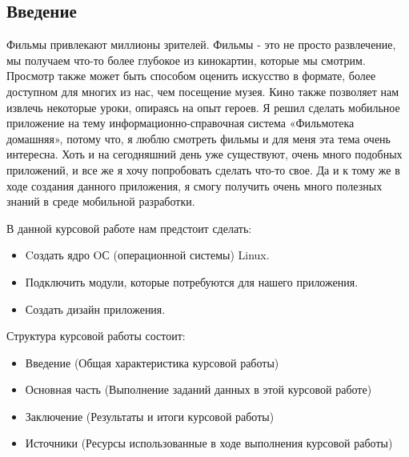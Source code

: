 
\setcounter{section}{1}
\begin{center}
\section*{Введение}
\end{center}

Фильмы привлекают миллионы зрителей. Фильмы - это не просто развлечение, мы получаем что-то более глубокое из кинокартин, которые мы смотрим. Просмотр также может быть способом оценить искусство в формате, более доступном для многих из нас, чем посещение музея. Кино также позволяет нам извлечь некоторые уроки, опираясь на опыт героев. Я решил сделать мобильное приложение на тему информационно-справочная система «Фильмотека домашняя», потому что, я люблю смотреть фильмы и для меня эта тема очень интересна. Хоть и на сегодняшний день уже существуют, очень много подобных приложений, и все же я хочу попробовать сделать что-то свое. Да и к тому же в ходе создания данного приложения, я смогу получить очень много полезных знаний в среде мобильной разработки. 

\noindent В данной курсовой работе нам предстоит сделать:	
\begin{itemize}
\item Cоздать ядро OС (операционной системы) Linux.
\item Подключить модули, которые потребуются для нашего приложения.
\item Создать дизайн приложения.
\end{itemize}

\noindent Структура курсовой работы состоит: 
\begin{itemize}
\item Введение (Общая характеристика курсовой работы)
\end{itemize}
\begin{itemize}
\item Основная часть (Выполнение заданий данных в этой курсовой работе)
\end{itemize}
\begin{itemize}
\item Заключение (Результаты и итоги курсовой работы) 
\end{itemize}
\begin{itemize}
\item Источники (Ресурсы использованные в ходе выполнения курсовой работы)
\end{itemize}

